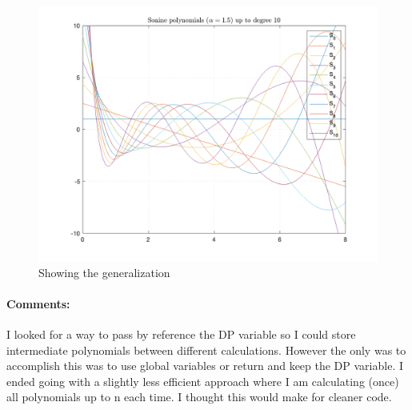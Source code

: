 \begin{figure}[H]
    \centering
    \includegraphics[width=12cm]{figures/ex3a}
    \caption{Showing the generalization}
\end{figure}

\paragraph{Comments:}
I looked for a way to pass by reference the DP variable so I could store intermediate polynomials between different calculations.
However the only was to accomplish this was to use global variables or return and keep the DP variable.
I ended going with a slightly less efficient approach where I am calculating (once) all polynomials up to n each time.
I thought this would make for cleaner code.

\bigskip
\